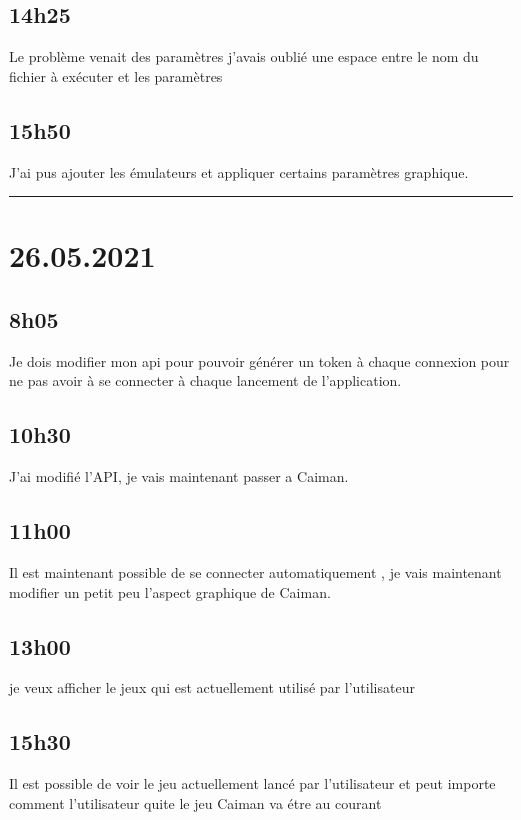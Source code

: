 \documentclass[a4paper,12pt,french]{sphinxmanual}
\begin{document}
\subsection{14h25}
\label{\detokenize{logbook:id153}}
\sphinxAtStartPar
Le problème venait des paramètres j’avais oublié une espace entre le nom du fichier à exécuter et les paramètres


\subsection{15h50}
\label{\detokenize{logbook:id154}}
\sphinxAtStartPar
J’ai pus ajouter les émulateurs et appliquer certains paramètres graphique.


\bigskip\hrule\bigskip



\section{26.05.2021}
\label{\detokenize{logbook:id155}}

\subsection{8h05}
\label{\detokenize{logbook:id156}}
\sphinxAtStartPar
Je dois modifier mon api pour pouvoir générer un token à chaque connexion pour ne pas avoir à se connecter à chaque lancement de l’application.


\subsection{10h30}
\label{\detokenize{logbook:id157}}
\sphinxAtStartPar
J’ai modifié l’API, je vais maintenant passer a Caiman.


\subsection{11h00}
\label{\detokenize{logbook:id158}}
\sphinxAtStartPar
Il est maintenant possible de se connecter automatiquement , je vais maintenant modifier un petit peu l’aspect graphique de Caiman.


\subsection{13h00}
\label{\detokenize{logbook:id159}}
\sphinxAtStartPar
je veux afficher le jeux qui est actuellement utilisé par l’utilisateur


\subsection{15h30}
\label{\detokenize{logbook:id160}}
\sphinxAtStartPar
Il est possible de voir le jeu actuellement lancé par l’utilisateur et peut importe comment l’utilisateur quite le jeu Caiman va étre au courant
\end{document}
